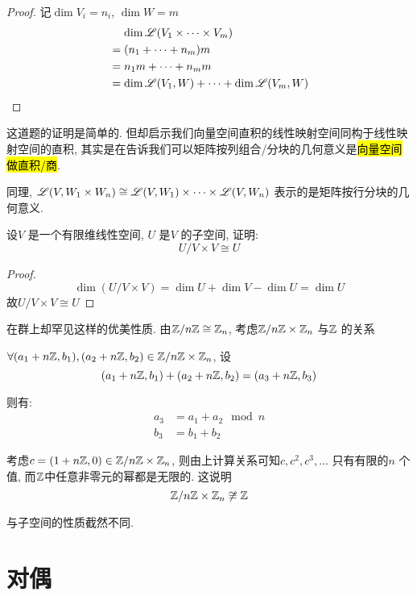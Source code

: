 \begin{proof}
    记\(\dim V_{i}=n_{i}\), \(\dim W=m\)
    \begin{align*}
        &\mathrel{\phantom{=}}\dim \mathscr{L}(V_{1} \times
        \dots \times V_{m}) \\
        &= (n_1+\dots+n_{m})m \\
        &= n_{1}m + \dots + n_{m}m \\
        &= \dim \mathscr{L}(V_{1},W) + \dots +
        \dim \mathscr{L}(V_{m},W)\\
    \end{align*}
\end{proof}
这道题的证明是简单的. 但却启示我们向量空间直积的线性映射空间同构于线性映射空间的直积,
其实是在告诉我们可以矩阵按列组合/分块的几何意义是\hl{向量空间做直积/商}.

同理, \(\mathscr{L}(V,W_1\times W_{n})\cong
    \mathscr{L}(V,W_1)\times \dots \times
\mathscr{L}(V,W_{n})\) 表示的是矩阵按行分块的几何意义.

\begin{problem}
    设\(V\) 是一个有限维线性空间, \(U\) 是\(V\) 的子空间, 证明:
    \[
        U/V \times V \cong U
    \]
\end{problem}

\begin{proof}
    \[
        \dim (U/V \times V) = \dim U + \dim V - \dim U = \dim U
    \]
    故\(U/V \times V \cong U\)
\end{proof}

在群上却罕见这样的优美性质. 由\(\mathbb{Z}/n\mathbb{Z} \cong
\mathbb{Z}_{n}\),
考虑\(\mathbb{Z}/n\mathbb{Z}\times\mathbb{Z}_{n}\) 与\(\mathbb{Z}\) 的关系

\(\forall (a_1+n\mathbb{Z}, b_1),(a_2+n\mathbb{Z}, b_2) \in
\mathbb{Z}/n\mathbb{Z} \times \mathbb{Z}_{n}\), 设\[
    (a_1+n\mathbb{Z}, b_1)+(a_2+n\mathbb{Z}, b_2) =
    (a_3+n\mathbb{Z}, b_3)
\]

则有:
\begin{align*}
    a_3 &= a_1 + a_2 \mod n \\
    b_3 &= b_1 + b_2
\end{align*}

考虑\(c=(1+n\mathbb{Z},0) \in \mathbb{Z}/n\mathbb{Z} \times
\mathbb{Z}_{n}\), 则由上计算关系可知\(c, c^{2}, c^{3}, \dots \) 只有有限的\(n\) 个值,
而\(\mathbb{Z}\)中任意非零元的幂都是无限的. 这说明
\[
    \mathbb{Z}/n\mathbb{Z} \times \mathbb{Z}_{n} \not\cong \mathbb{Z}
\]

与子空间的性质截然不同.

\section{对偶}

